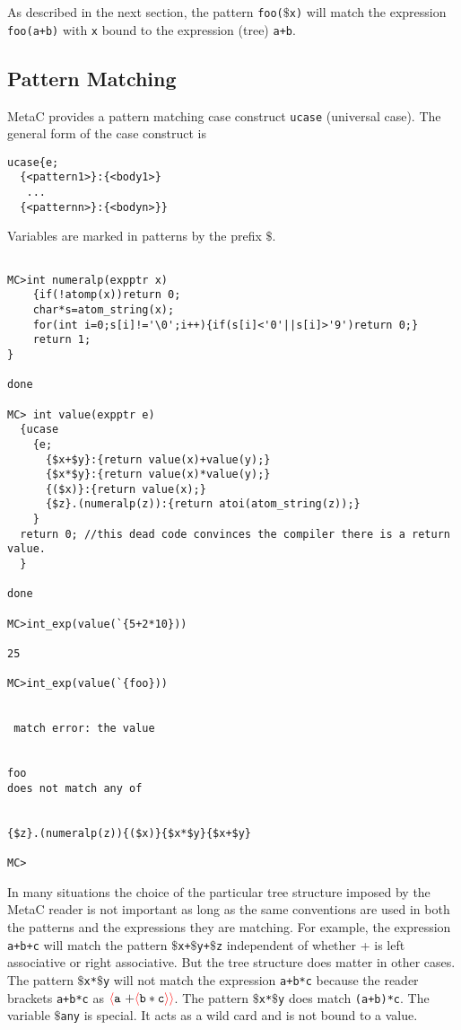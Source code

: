 \documentclass{article}
\newcommand{\fopen}{{\color{red} \langle}}
\newcommand{\fclose}{{\color{red} \rangle}}
\begin{document}
As described in the next section, the pattern {\tt foo($\$$x)} will match the expression {\tt foo(a+b)} with {\tt x} bound to the expression (tree) {\tt a+b}.

\subsection{Pattern Matching}

MetaC provides a pattern matching case construct {\tt ucase} (universal case).
The general form of the case construct is

\begin{verbatim}
ucase{e;
  {<pattern1>}:{<body1>}
   ...
  {<patternn>}:{<bodyn>}}
\end{verbatim}

Variables are marked in patterns by the prefix $\$$.

\begin{verbatim}

MC>int numeralp(expptr x)
    {if(!atomp(x))return 0;
    char*s=atom_string(x);
    for(int i=0;s[i]!='\0';i++){if(s[i]<'0'||s[i]>'9')return 0;}
    return 1;
}

done

MC> int value(expptr e)
  {ucase
    {e;
      {$x+$y}:{return value(x)+value(y);}
      {$x*$y}:{return value(x)*value(y);}
      {($x)}:{return value(x);}
      {$z}.(numeralp(z)):{return atoi(atom_string(z));}
    }
  return 0; //this dead code convinces the compiler there is a return value.
  }

done

MC>int_exp(value(`{5+2*10}))

25

MC>int_exp(value(`{foo}))


 match error: the value 


foo
does not match any of


{$z}.(numeralp(z)){($x)}{$x*$y}{$x+$y}

MC>
\end{verbatim}

In many situations the choice of the particular tree structure imposed by the MetaC reader is not important as long as the same conventions are used in both the patterns and the expressions
they are matching.  For example, the expression {\tt a+b+c} will match the pattern
{\tt $\$$x+$\$$y+$\$$z} independent of whether + is left associative or right associative.  But the tree structure does matter in other cases.  The pattern {\tt $\$$x*$\$$y}
will not match the expression {\tt a+b*c} because the reader brackets {\tt a+b*c} as  $\fopen \mathtt{a~+} \fopen \mathtt{b * c} \fclose\fclose$. The pattern {\tt $\$$x*$\$$y} does match {\tt (a+b)*c}.
The variable {\tt $\$$any} is special.  It acts as a wild card and is not bound to a value.
\end{document}
